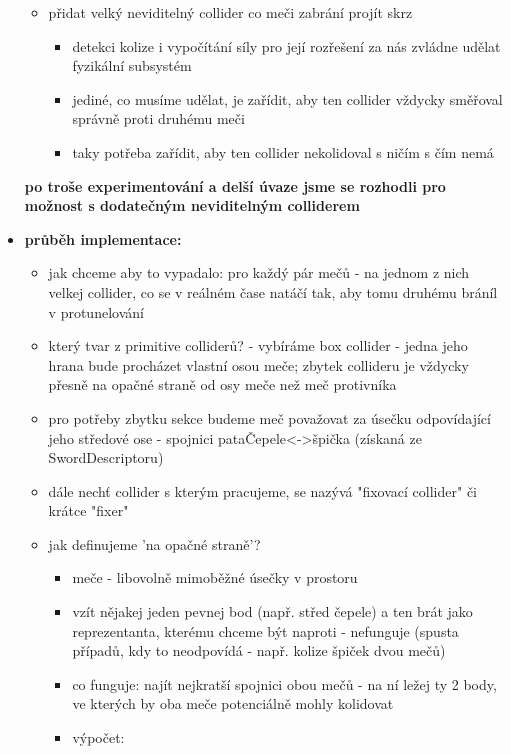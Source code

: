 \begin{itemize}
\begin{itemize}
\begin{itemize}
      \end{itemize}
    \item přidat velký neviditelný collider co meči zabrání projít skrz
      \begin{itemize}
        \item detekci kolize i vypočítání síly pro její rozřešení za nás zvládne udělat fyzikální subsystém
        \item jediné, co musíme udělat, je zařídit, aby ten collider vždycky směřoval správně proti druhému meči
        \item taky potřeba zařídit, aby ten collider nekolidoval s ničím s čím nemá
      \end{itemize}
  \end{itemize}
  \textbf{po troše experimentování a delší úvaze jsme se rozhodli pro možnost s dodatečným neviditelným colliderem}
  \item \textbf{průběh implementace:}
  \begin{itemize}
    \item jak chceme aby to vypadalo: pro každý pár mečů - na jednom z nich velkej collider, co se v reálném čase natáčí tak, aby tomu druhému bráníl v protunelování 
    \item který tvar z primitive colliderů? - vybíráme box collider - jedna jeho hrana bude procházet vlastní osou meče; zbytek collideru je vždycky přesně na opačné straně od osy meče než meč protivníka
    \item pro potřeby zbytku sekce budeme meč považovat za úsečku odpovídající jeho středové ose - spojnici pataČepele<->špička (získaná ze SwordDescriptoru)
    \item dále nechť collider s kterým pracujeme, se nazývá "fixovací collider" či krátce "fixer"
    \item jak definujeme 'na opačné straně'?  
      \begin{itemize}
        \item meče - libovolně mimoběžné úsečky v prostoru
        \item vzít nějakej jeden pevnej bod (např. střed čepele) a ten brát jako reprezentanta, kterému chceme být naproti - nefunguje (spusta případů, kdy to neodpovídá - např. kolize špiček dvou mečů)
        \item co funguje: najít nejkratší spojnici obou mečů - na ní ležej ty 2 body, ve kterých by oba meče potenciálně mohly kolidovat
        \item výpočet:
          \begin{itemize}

\end{itemize}
\end{itemize}
\end{itemize}
\end{itemize}
